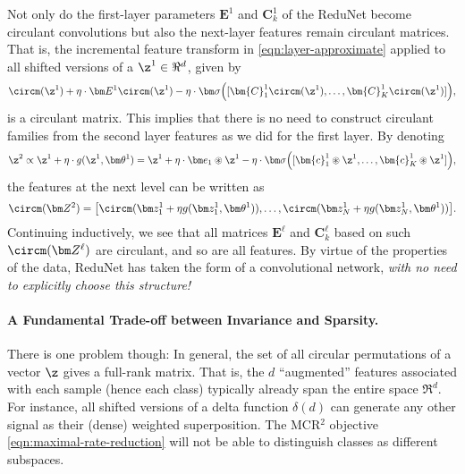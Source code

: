 \documentclass[../../book-main.tex]{subfiles}
\begin{document}
Not only do the first-layer parameters $\bm E^1$ and $\bm{C}^1_k$ of the ReduNet become circulant convolutions but also the next-layer features remain circulant matrices. 
That is, the incremental feature transform in \eqref{eqn:layer-approximate} applied to all shifted versions of a $\z^1 \in \Re^d$, given by
\begin{equation}
    \circm(\z^1) + \eta \cdot \bm E^1 \circm(\z^1) - \eta \cdot \bm \sigma \Big([\bm{C}_1^1 \circm(\z^1), \ldots, \bm{C}^1_K \circm(\z^1)] \Big),
\end{equation}
is a circulant matrix.  This implies that there is no need to construct circulant families from the second layer features as we did for the first layer. 
By denoting
\begin{equation}
\z^{2} \propto \z^{1} +\eta \cdot g(\z^{1}, \bm \theta^{1}) =  \z^1 + \eta \cdot \bm e_{1} \circledast \z^{1} -  \eta \cdot \bm \sigma\Big([\bm{c}_{1}^{1} \circledast \z^{1}, \dots, \bm{c}^{1}_{K} \circledast \z^{1}]\Big),
\label{eqn:approximate-convolution}
\end{equation}
the features at the next level can be written as
$$\circm(\bm Z^2) = \big[ \circm( \bm z_{1}^1 + \eta g( \bm z_{1}^1, \bm \theta^1)), \dots, \circm( \bm z_{N}^1 + \eta g(\bm z_{N}^1, \bm \theta^1)) \big].$$
Continuing inductively, we see that all matrices $\bm E^\ell$ and $\bm C^\ell_k$ based on such $\circm(\bm Z^\ell)$ are circulant, and so are all features. 
By virtue of the properties of the data, ReduNet has taken the form of a convolutional network, {\em with no need to explicitly choose this structure!} 

\paragraph{A Fundamental Trade-off between Invariance and Sparsity.} 
There is one problem though: In general, the set of all circular permutations of a vector $\z$ gives a full-rank matrix. That is, the $d$ ``augmented'' features associated with each sample (hence each class) typically already span the entire space $\Re^d$. For instance, all shifted versions of a delta function $\delta(d)$ can generate any other signal as their (dense) weighted superposition. The MCR$^2$ objective \eqref{eqn:maximal-rate-reduction} will not be able to distinguish classes as different subspaces.
\end{document}
